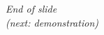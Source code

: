 \documentclass{beamer}
\begin{document}

	\begin{frame}{}
	\centering \Huge
	\emph{End of slide}\\ 
	\emph{(next: demonstration)}
	\end{frame}
\end{document}
